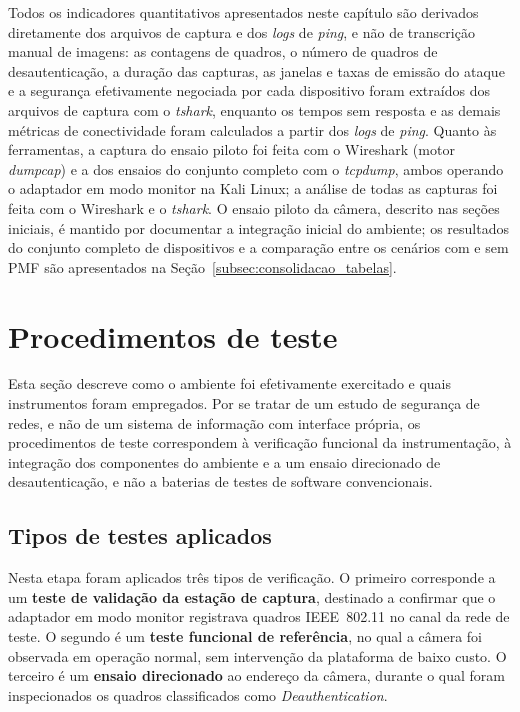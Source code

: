 Todos os indicadores quantitativos apresentados neste capítulo são derivados diretamente dos arquivos de captura e dos \textit{logs} de \textit{ping}, e não de transcrição manual de imagens: as contagens de quadros, o número de quadros de desautenticação, a duração das capturas, as janelas e taxas de emissão do ataque e a segurança efetivamente negociada por cada dispositivo foram extraídos dos arquivos de captura com o \textit{tshark}, enquanto os tempos sem resposta e as demais métricas de conectividade foram calculados a partir dos \textit{logs} de \textit{ping}. Quanto às ferramentas, a captura do ensaio piloto foi feita com o Wireshark (motor \textit{dumpcap}) e a dos ensaios do conjunto completo com o \textit{tcpdump}, ambos operando o adaptador em modo monitor na Kali Linux; a análise de todas as capturas foi feita com o Wireshark e o \textit{tshark}. O ensaio piloto da câmera, descrito nas seções iniciais, é mantido por documentar a integração inicial do ambiente; os resultados do conjunto completo de dispositivos e a comparação entre os cenários com e sem PMF são apresentados na Seção~\ref{subsec:consolidacao_tabelas}.



\section{Procedimentos de teste}

Esta seção descreve como o ambiente foi efetivamente exercitado e quais instrumentos foram empregados. Por se tratar de um estudo de segurança de redes, e não de um sistema de informação com interface própria, os procedimentos de teste correspondem à verificação funcional da instrumentação, à integração dos componentes do ambiente e a um ensaio direcionado de desautenticação, e não a baterias de testes de software convencionais.

\subsection{Tipos de testes aplicados}

Nesta etapa foram aplicados três tipos de verificação. O primeiro corresponde a um \textbf{teste de validação da estação de captura}, destinado a confirmar que o adaptador em modo monitor registrava quadros IEEE~802.11 no canal da rede de teste. O segundo é um \textbf{teste funcional de referência}, no qual a câmera foi observada em operação normal, sem intervenção da plataforma de baixo custo. O terceiro é um \textbf{ensaio direcionado} ao endereço da câmera, durante o qual foram inspecionados os quadros classificados como \textit{Deauthentication}.

